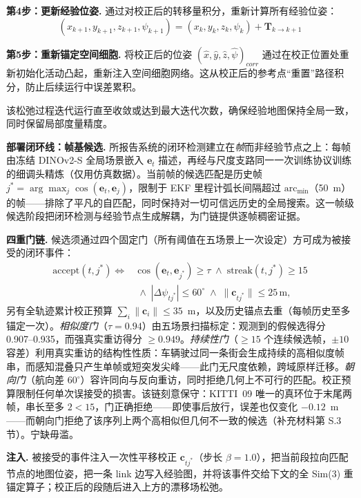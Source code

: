 \textbf{第4步：更新经验位姿.} 通过对校正后的转移量积分，重新计算所有经验位姿：
\begin{equation}
    (x_{k+1}, y_{k+1}, z_{k+1}, \psi_{k+1}) = (x_k, y_k, z_k, \psi_k) + \mathbf{T}_{k \to k+1}
\end{equation}

\textbf{第5步：重新锚定空间细胞.} 将校正后的位姿 $(\hat{x}, \hat{y}, \hat{z}, \hat{\psi})_{corr}$ 通过在校正位置处重新初始化活动凸起，重新注入空间细胞网络。这从校正后的参考点“重置”路径积分，防止后续运行中误差累积。

该松弛过程迭代运行直至收敛或达到最大迭代次数，确保经验地图保持全局一致，同时保留局部度量精度。

\textbf{部署闭环线：帧基候选.} 所报告系统的闭环检测建立在\emph{帧}而非经验节点之上：每帧由冻结 DINOv2-S 全局场景嵌入 $\mathbf{e}_t$ 描述，再经与尺度支路同一一次训练协议训练的细调头精炼（仅用仿真数据）。当前帧的候选匹配是历史帧 $j^{*} = \arg\max_{j} \cos(\mathbf{e}_t, \mathbf{e}_j)$，限制于 EKF 里程计弧长间隔超过 $\mathrm{arc}_{\min}$（50~m）的帧——排除了平凡的自匹配，同时保持对一切可信远历史的全局搜索。这一帧级候选阶段把闭环检测与经验节点生成解耦，为门链提供逐帧稠密证据。

\textbf{四重门链.} 候选须通过四个固定门（所有阈值在五场景上一次设定）方可成为被接受的闭环事件：
\begin{align}
    \mathrm{accept}(t, j^{*}) \iff{}
    & \cos(\mathbf{e}_t, \mathbf{e}_{j^{*}}) \ge \tau
    \;\wedge\; \mathrm{streak}(t, j^{*}) \ge 15 \nonumber\\
    &\;\wedge\; |\Delta\psi_{t j^{*}}| \le 60^{\circ}
    \;\wedge\; \lVert \mathbf{c}_{t j^{*}} \rVert \le 25\,\mathrm{m},
\end{align}
另有全轨迹累计校正预算 $\sum_i \lVert \mathbf{c}_i \rVert \le 35$~m，以及历史锚点去重（每帧历史至多锚定一次）。\emph{相似度门}（$\tau = 0.94$）由五场景扫描标定：观测到的假候选得分 0.907--0.935，而强真实重访得分 $\ge 0.949$。\emph{持续性门}（$\ge 15$ 个连续候选帧，$\pm 10$ 容差）利用真实重访的结构性性质：车辆驶过同一条街会生成持续的高相似度帧串，而感知混叠只产生单帧或短突发尖峰——此门无尺度依赖，跨域原样迁移。\emph{朝向门}（航向差 $60^{\circ}$）容许同向与反向重访，同时拒绝几何上不可行的匹配。校正预算限制任何单次误接受的损害。该链刻意保守：KITTI~09 唯一的真环位于末尾两帧，串长至多 $2 < 15$，门正确拒绝——即使事后放行，误差也仅变化 $-0.12$~m——而朝向门拒绝了该序列上两个高相似但几何不一致的候选（补充材料第 S.3 节）。宁缺毋滥。

\textbf{注入.} 被接受的事件注入一次性平移校正 $\mathbf{c}_{t j^{*}}$（步长 $\beta = 1.0$），把当前段拉向匹配节点的地图位姿，把一条 link 边写入经验图，并将该事件交给下文的全 Sim(3) 重锚定算子；校正后的段随后进入上方的漂移场松弛。

